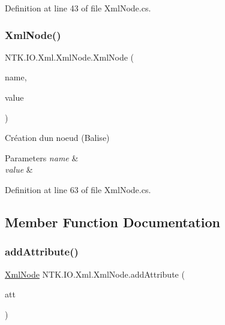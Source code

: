Definition at line 43 of file Xml\+Node.\+cs.

\mbox{\label{class_n_t_k_1_1_i_o_1_1_xml_1_1_xml_node_acd1c7c6f312efd395aa8f5277c0dfb4f}} 
\subsubsection{\texorpdfstring{XmlNode()}{XmlNode()}\hspace{0.1cm}{\footnotesize\ttfamily [3/3]}}
{\footnotesize\ttfamily N\+T\+K.\+I\+O.\+Xml.\+Xml\+Node.\+Xml\+Node (\begin{DoxyParamCaption}\item[{String}]{name,  }\item[{String}]{value }\end{DoxyParamCaption})}



Création d\textquotesingle{}un noeud (Balise) 


\begin{DoxyParams}{Parameters}
{\em name} & \\
\hline
{\em value} & \\
\hline
\end{DoxyParams}


Definition at line 63 of file Xml\+Node.\+cs.



\subsection{Member Function Documentation}
\mbox{\label{class_n_t_k_1_1_i_o_1_1_xml_1_1_xml_node_a95ee3c8d64d332b3f544cbbca7b8ae62}} 
\subsubsection{\texorpdfstring{addAttribute()}{addAttribute()}\hspace{0.1cm}{\footnotesize\ttfamily [1/2]}}
{\footnotesize\ttfamily \mbox{\hyperlink{class_n_t_k_1_1_i_o_1_1_xml_1_1_xml_node}{Xml\+Node}} N\+T\+K.\+I\+O.\+Xml.\+Xml\+Node.\+add\+Attribute (\begin{DoxyParamCaption}\item[{\mbox{\hyperlink{class_n_t_k_1_1_i_o_1_1_xml_1_1_xml_attribute}{Xml\+Attribute}}}]{att }\end{DoxyParamCaption})}






